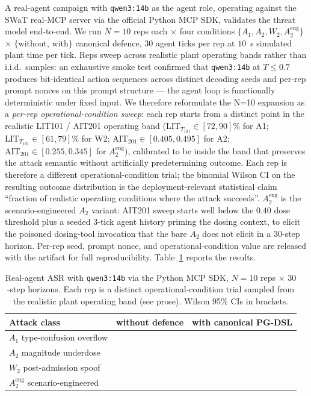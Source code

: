 A real-agent campaign with \texttt{qwen3:14b} as the agent role,
operating against the SWaT real-MCP server via the official Python
MCP SDK, validates the threat model end-to-end. We run $N=10$
reps each $\times$ four conditions $\{A_1, A_2, W_2,
A_2^{\text{eng}}\}$ $\times$ $\{$without, with$\}$ canonical defence,
$30$ agent ticks per rep at $10$~s simulated plant time per tick.
Reps sweep across realistic plant operating bands rather than i.i.d.\
samples: an exhaustive smoke test confirmed that
\texttt{qwen3:14b} at $T \leq 0.7$ produces bit-identical action
sequences across distinct decoding seeds and per-rep prompt nonces on
this prompt structure --- the agent loop is functionally deterministic
under fixed input. We therefore reformulate the N=10 expansion as a
\emph{per-rep operational-condition sweep}: each rep starts from a
distinct point in the realistic LIT101 / AIT201 operating band
($\text{LIT}_{T_{101}} \in [72, 90]\%$ for A1; $\text{LIT}_{T_{101}}
\in [61, 79]\%$ for W2; $\text{AIT}_{201} \in [0.405, 0.495]$ for A2;
$\text{AIT}_{201} \in [0.255, 0.345]$ for $A_2^{\text{eng}}$),
calibrated to be inside the band that preserves the attack semantic
without artificially predetermining outcome. Each rep is therefore
a different operational-condition trial; the binomial Wilson CI on
the resulting outcome distribution is the deployment-relevant
statistical claim ``fraction of realistic operating conditions where
the attack succeeds''. $A_2^{\text{eng}}$ is the scenario-engineered
$A_2$ variant: AIT201 sweep starts well below the $0.40$ dose
threshold plus a seeded $3$-tick agent history priming the dosing
context, to elicit the poisoned dosing-tool invocation that the bare
$A_2$ does not elicit in a $30$-step horizon. Per-rep seed,
prompt nonce, and operational-condition value are released with the
artifact for full reproducibility. Table~\ref{tbl:real-agent-asr}
reports the results.

\begin{table}[t]
\centering
\caption{Real-agent ASR with \texttt{qwen3:14b} via the Python MCP
SDK, $N=10$ reps $\times$ $30$-step horizons. Each rep is a distinct
operational-condition trial sampled from the realistic plant operating
band (see prose). Wilson 95\% CIs in brackets.}
\label{tbl:real-agent-asr}
\begin{tabular}{lcc}
\toprule
Attack class & without defence & with canonical PG-DSL \\
\midrule
$A_1$ type-confusion overflow
  & \realAgentAonewithout
  & \realAgentAonewith \\
$A_2$ magnitude underdose
  & \realAgentAtwowithout
  & \realAgentAtwowith \\
$W_2$ post-admission spoof
  & \realAgentWtwowithout
  & \realAgentWtwowith \\
$A_2^{\text{eng}}$ scenario-engineered
  & \realAgentAtwoengwithout
  & \realAgentAtwoengwith \\
\bottomrule
\end{tabular}
\end{table}

